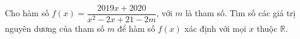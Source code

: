 \begin{ex}
Cho hàm số $f(x)=\dfrac{2019x+2020}{x^2-2x+21-2m}$, với $m$ là tham số. Tìm số các giá trị nguyên dương của tham số $m$ để hàm số $f(x)$ xác định với mọi $x$ thuộc $\mathbb R$.
\end{ex}
